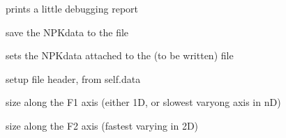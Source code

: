 \documentclass[letterpaper,10pt,openany,oneside]{sphinxmanual}
\begin{document}
\begin{fulllineitems}
\begin{fulllineitems}
\end{fulllineitems}


\begin{fulllineitems}
\label{rst/code:File.GifaFile.GifaFile.report}
prints a little debugging report

\end{fulllineitems}


\begin{fulllineitems}
\label{rst/code:File.GifaFile.GifaFile.save}
save the NPKdata to the file

\end{fulllineitems}


\begin{fulllineitems}
\label{rst/code:File.GifaFile.GifaFile.set_data}
sets the NPKdata attached to the (to be written) file

\end{fulllineitems}


\begin{fulllineitems}
\label{rst/code:File.GifaFile.GifaFile.setup_header}
setup file header, from self.data

\end{fulllineitems}


\begin{fulllineitems}
\label{rst/code:File.GifaFile.GifaFile.size1}
size along the F1 axis (either 1D, or slowest varyong axis in nD)

\end{fulllineitems}


\begin{fulllineitems}
\label{rst/code:File.GifaFile.GifaFile.size2}
size along the F2 axis (fastest varying in 2D)


\end{fulllineitems}
\end{fulllineitems}
\end{document}
